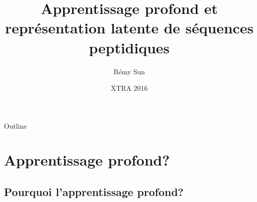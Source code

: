 \documentclass{beamer}
\title %
{Apprentissage profond et représentation latente de séquences peptidiques}
\author{Rémy Sun} %
\institute[ENS Rennes] %
{
  Département d'informatique\\
  ENS Rennes
}
\date[XTRA 2016] %
{XTRA 2016}
\begin{document}
\begin{frame}
  \titlepage
\end{frame}

\begin{frame}{Outline}
  \tableofcontents[pausesections]
\end{frame}





\section{Apprentissage profond?}

\subsection{Pourquoi l'apprentissage \og profond\fg?}
\end{document}
